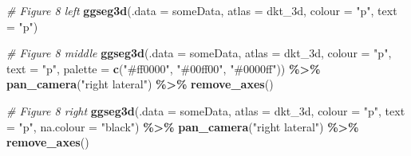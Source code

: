 \documentclass[fleqn,10pt]{wlpeerj} %
\newenvironment{Shaded}{\begin{snugshade}}{\end{snugshade}}
\newcommand{\CommentTok}[1]{\textcolor[rgb]{0.56,0.35,0.01}{\textit{#1}}}
\newcommand{\DataTypeTok}[1]{\textcolor[rgb]{0.13,0.29,0.53}{#1}}
\newcommand{\KeywordTok}[1]{\textcolor[rgb]{0.13,0.29,0.53}{\textbf{#1}}}
\newcommand{\NormalTok}[1]{#1}
\newcommand{\OperatorTok}[1]{\textcolor[rgb]{0.81,0.36,0.00}{\textbf{#1}}}
\newcommand{\StringTok}[1]{\textcolor[rgb]{0.31,0.60,0.02}{#1}}
\begin{document}
\begin{Shaded}
\begin{Highlighting}[]
\CommentTok{\# Figure 8 left}
\KeywordTok{ggseg3d}\NormalTok{(}\DataTypeTok{.data =}\NormalTok{ someData, }\DataTypeTok{atlas =}\NormalTok{ dkt\_3d, }\DataTypeTok{colour =} \StringTok{"p"}\NormalTok{, }\DataTypeTok{text =} \StringTok{"p"}\NormalTok{)}

\CommentTok{\# Figure 8 middle}
\KeywordTok{ggseg3d}\NormalTok{(}\DataTypeTok{.data =}\NormalTok{ someData, }
        \DataTypeTok{atlas =}\NormalTok{ dkt\_3d,}
        \DataTypeTok{colour =} \StringTok{"p"}\NormalTok{, }\DataTypeTok{text =} \StringTok{"p"}\NormalTok{,}
        \DataTypeTok{palette =} \KeywordTok{c}\NormalTok{(}\StringTok{"\#ff0000"}\NormalTok{, }\StringTok{"\#00ff00"}\NormalTok{, }\StringTok{"\#0000ff"}\NormalTok{)) }\OperatorTok{\%>\%}\StringTok{   }
\StringTok{  }\KeywordTok{pan\_camera}\NormalTok{(}\StringTok{"right lateral"}\NormalTok{) }\OperatorTok{\%>\%}\StringTok{ }
\StringTok{  }\KeywordTok{remove\_axes}\NormalTok{()}

\CommentTok{\# Figure 8 right}
\KeywordTok{ggseg3d}\NormalTok{(}\DataTypeTok{.data =}\NormalTok{ someData, }
        \DataTypeTok{atlas =}\NormalTok{ dkt\_3d,}
        \DataTypeTok{colour =} \StringTok{"p"}\NormalTok{, }\DataTypeTok{text =} \StringTok{"p"}\NormalTok{,}
        \DataTypeTok{na.colour =} \StringTok{"black"}\NormalTok{) }\OperatorTok{\%>\%}\StringTok{   }
\StringTok{  }\KeywordTok{pan\_camera}\NormalTok{(}\StringTok{"right lateral"}\NormalTok{) }\OperatorTok{\%>\%}\StringTok{ }
\StringTok{  }\KeywordTok{remove\_axes}\NormalTok{()}
\end{Highlighting}
\end{Shaded}
\end{document}
